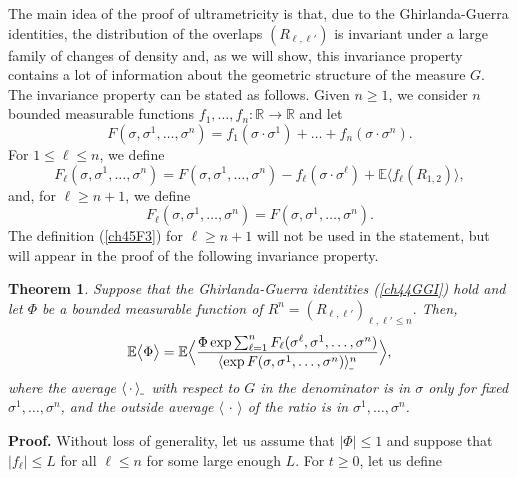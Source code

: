 \documentclass[12pt]{article}
\newcommand{\e}{\mathbb{E}}
\newcommand{\Reals}{\mathbb{R}}
\newcommand{\la}{\langle}
\newcommand{\ra}{\rangle}
\newtheorem{theorem}{Theorem}
\theoremstyle{nonumberplain}
\begin{document}
\medskip
The main idea of the proof of ultrametricity is that, due to the Ghirlanda-Guerra identities, the distribution of the overlaps $(R_{\ell,\ell'})$ is invariant under a large family of changes of density and, as we will show,
this invariance property contains a lot of information about the geometric structure of the measure $G$. The invariance property can be stated as follows. Given $n\geq 1$, we consider $n$ bounded measurable functions $f_1,\ldots, f_n:  \Reals\to\Reals$ and let
\begin{equation}
F(\sigma,\sigma^1,\ldots,\sigma^n) = f_1(\sigma\cdot\sigma^1)+\ldots+f_n(\sigma\cdot\sigma^n).
\label{ch45F1}
\end{equation}
For $1\leq \ell\leq n$, we define
\begin{equation}
F_{\ell}(\sigma,\sigma^1,\ldots,\sigma^n) = F(\sigma,\sigma^1,\ldots,\sigma^n)
 - f_{\ell}( \sigma\cdot\sigma^{\ell})+ \e \bigl \la f_{\ell}(R_{1,2}) \bigr\ra,
\label{ch45F2}
\end{equation}
and, for $\ell\geq n+1$, we define
\begin{equation}
F_{\ell}(\sigma,\sigma^1,\ldots,\sigma^n) =F(\sigma,\sigma^1,\ldots,\sigma^n).
\label{ch45F3}
\end{equation}
The definition (\ref{ch45F3}) for $\ell\geq n+1$ will not be used in the statement, but will appear in the proof of the following invariance property.
\begin{theorem}\label{ch45Th1}
Suppose that the Ghirlanda-Guerra identities (\ref{ch44GGI}) hold and let $\Phi$ be a bounded measurable function of $R^n=(R_{\ell,\ell'})_{\ell,\ell'\leq n}.$ Then,
\begin{equation}
\e \bigl\la\Phi \bigr \ra =
\e\Bigl\la
\frac{ \Phi \exp \sum_{\ell=1}^{n} F_{\ell}(\sigma^{\ell},\sigma^1,\ldots,\sigma^n)}
{\la\exp F(\sigma,\sigma^1,\ldots,\sigma^n)\ra_{\hspace{-0.3mm}\mathunderscore}^n}
\Bigr\ra,
\label{ch45main}
\end{equation}
where the average $\la\,\cdot\,\ra_{\hspace{-0.3mm}\mathunderscore}$ with respect to $G$ in the denominator is in $\sigma$ only for fixed  $\sigma^1,\ldots, \sigma^n$, and the outside average $\la\,\cdot\, \ra$ of the ratio is in $\sigma^1,\ldots, \sigma^n$.
\end{theorem}
\noindent\textbf{Proof.}
Without loss of generality, let us assume that $|\Phi| \leq 1$ and suppose that $|f_{\ell}|\leq L$ for all $\ell\leq n$ for some large enough $L.$ For $t\geq 0$, let us define
\end{document}
